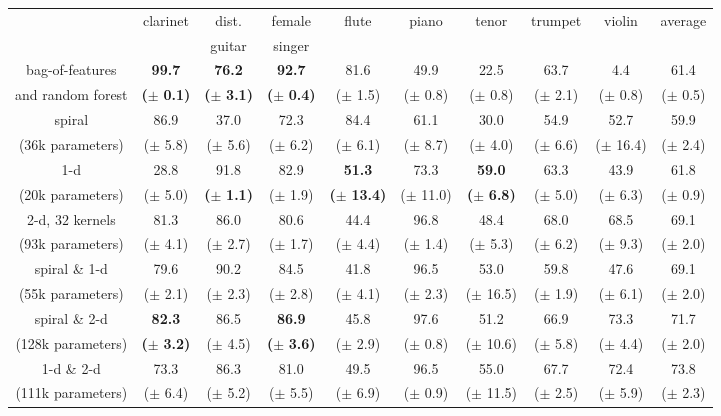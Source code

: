 \documentclass{article}
\newcommand*{\s}[1]{\small{($\pm$ #1)}}
\newcommand*{\g}[1]{\small{\textbf{(}$\boldsymbol{\pm}$ \textbf{#1}\textbf{)}}}
\begin{document}
\begin{table}[t]
    \begin{center}
    \setlength{\unitlength}{1cm}
    \begin{tabular}{|c|cccccccc|c|}
        \hline
        & clarinet & dist. & female & flute & piano & tenor & trumpet & violin & average \\
        &             & guitar & singer &        &           &          &              &          &                \\
        \hline
        bag-of-features
        & \textbf{99.7} & \textbf{76.2} & \textbf{92.7} & 81.6 & 49.9 & 22.5 & 63.7 & \hphantom{0}4.4 & 61.4 \\
        and random forest
        &\g{0.1}&\g{3.1}&\g{0.4}&\s{1.5}&\s{0.8}&\s{0.8}&\s{2.1}&\s{0.8} & \s{0.5}\\
        \hline
        spiral
        & 86.9 & 37.0 & 72.3 & 84.4 & 61.1 & 30.0 & 54.9 & 52.7 & 59.9 \\
        (36k parameters)
        &\s{5.8}&\s{5.6}&\s{6.2}&\s{6.1}&\s{8.7}&\s{4.0}&\s{6.6}&\s{16.4}&\s{2.4}\\
        \hline
        1-d
        & 28.8 & 91.8 & 82.9 & \textbf{51.3} & 73.3 & \textbf{59.0} & 63.3 & 43.9 & 61.8 \\
        (20k parameters)
        &\s{5.0}&\g{1.1}&\s{1.9}&\g{13.4}&\s{11.0}&\g{6.8}&\s{5.0}&\s{6.3}&\s{0.9} \\
        \hline
        2-d, $32$ kernels
        & 81.3 & 86.0 & 80.6 & 44.4 & 96.8 & 48.4 & 68.0 & 68.5 & 69.1 \\
        (93k parameters)
        &\s{4.1}&\s{2.7}&\s{1.7}&\s{4.4}&\s{1.4}&\s{5.3}&\s{6.2}&\s{9.3}&\s{2.0} \\
        \hline
        spiral \& 1-d
        & 79.6 & 90.2 & 84.5 & 41.8 & 96.5 & 53.0 & 59.8 & 47.6 & 69.1 \\
        (55k parameters)
        &\s{2.1}&\s{2.3}&\s{2.8}&\s{4.1}&\s{2.3}&\s{16.5}&\s{1.9}&\s{6.1}&\s{2.0}\\
        \hline
        spiral \& 2-d
        & \textbf{82.3} & 86.5 & \textbf{86.9} & 45.8 & 97.6 & 51.2 & 66.9 & 73.3 & 71.7 \\
        (128k parameters)
        &\g{3.2}&\s{4.5}&\g{3.6}&\s{2.9}&\s{0.8}&\s{10.6}&\s{5.8}&\s{4.4}&\s{2.0}\\
        \hline
        1-d \& 2-d
        & 73.3 & 86.3 & 81.0 & 49.5 & 96.5 & 55.0 & 67.7 & 72.4 & 73.8 \\
        (111k parameters)
        &\s{6.4}&\s{5.2}&\s{5.5}&\s{6.9}&\s{0.9}&\s{11.5}&\s{2.5}&\s{5.9}&\s{2.3}\\

\end{tabular}
\end{center}
\end{table}
\end{document}

